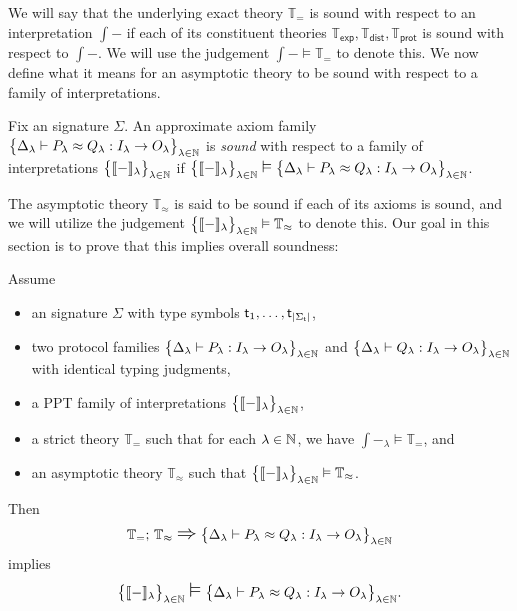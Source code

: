 We will say that the underlying exact \ipdl theory $\mathbb{T}_=$ is sound with respect to an interpretation $\int{-}$ if each of its constituent theories $\mathbb{T}_\mathsf{exp}, \mathbb{T}_\mathsf{dist}, \mathbb{T}_\mathsf{prot}$ is sound with respect to $\int{-}$. We will use the judgement $\int{-} \vDash \mathbb{T}_=$ to denote this. We now define what it means for an asymptotic theory to be sound with respect to a family of interpretations.

\begin{definition}
Fix an \ipdl signature $\Sigma$. An approximate axiom family $\big\{\Delta_\lambda \vdash P_\lambda \approx Q_\lambda : I_\lambda \to O_\lambda\big\}_{\lambda \in \mathbb{N}}$ is \emph{sound} with respect to a family of interpretations $\big\{\llbracket - \rrbracket_\lambda\big\}_{\lambda \in \mathbb{N}}$ if $\big\{\int{-}_\lambda\big\}_{\lambda \in \nat} \; \mathlarger{\mathlarger{\vDash}} \; \big\{\Delta_\lambda \vdash P_\lambda \approx Q_\lambda : I_\lambda \to O_\lambda\big\}_{\lambda \in \nat}$.
\end{definition}

\noindent The asymptotic \ipdl theory $\mathbb{T}_\approx$ is said to be sound if each of its axioms is sound, and we will utilize the judgement $\big\{\llbracket - \rrbracket_\lambda\big\}_{\lambda \in \mathbb{N}} \vDash \mathbb{T}_\approx$ to denote this. Our goal in this section is to prove that this implies overall soundness:

\begin{theorem}\label{thm:main}
Assume
\begin{itemize}
\item an \ipdl signature $\Sigma$ with type symbols $\mathsf{t}_1,\ldots,\mathsf{t}_{|\Sigma_\mathsf{t}|}$,

\item two protocol families $\big\{\Delta_\lambda \vdash P_\lambda : I_\lambda \to O_\lambda\big\}_{\lambda \in \mathbb{N}}$ and $\big\{\Delta_\lambda \vdash Q_\lambda : I_\lambda \to O_\lambda\big\}_{\lambda \in \mathbb{N}}$ with identical typing judgments,

\item a PPT family of interpretations $\big\{\llbracket - \rrbracket_\lambda\big\}_{\lambda \in \mathbb{N}}$,

\item a strict \ipdl theory $\mathbb{T}_=$ such that for each $\lambda \in \mathbb{N}$, we have $\int{-}_\lambda \vDash \mathbb{T}_=$, and

\item an asymptotic \ipdl theory $\mathbb{T}_\approx$ such that $\big\{\llbracket - \rrbracket_\lambda\big\}_{\lambda \in \mathbb{N}} \vDash \mathbb{T}_\approx$.
\end{itemize}
Then
\[ \mathbb{T}_=; \, \mathbb{T}_\approx \; \mathlarger{\mathlarger{\Rightarrow}} \; \big\{\Delta_\lambda \vdash P_\lambda \approx Q_\lambda : I_\lambda \to O_\lambda\big\}_{\lambda \in \nat}
\]  
implies
\[\big\{\int{-}_\lambda\big\}_{\lambda \in \nat} \; \mathlarger{\mathlarger{\vDash}} \; \big\{\Delta_\lambda \vdash P_\lambda \approx Q_\lambda : I_\lambda \to O_\lambda\big\}_{\lambda \in \nat}.\]
\end{theorem}

